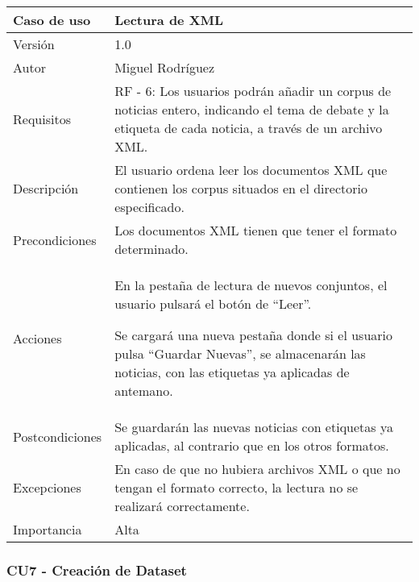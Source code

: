 \begin{center}
\begin{tabular}{ | m{3cm} | m{10cm}| } 
\hline
Caso de uso & Lectura de XML \\ 
\hline
Versión & 1.0 \\ 
\hline
Autor & Miguel Rodríguez \\ 
\hline
Requisitos & RF - 6: Los usuarios podrán añadir un corpus de noticias entero, indicando el tema de debate y la etiqueta de cada noticia, a través de un archivo XML. \\ 
\hline
Descripción & El usuario ordena leer los documentos XML que contienen los corpus situados en el directorio especificado.\\
\hline
Precondiciones & Los documentos XML tienen que tener el formato determinado. \\
\hline
Acciones & En la pestaña de lectura de nuevos conjuntos, el usuario pulsará el botón de ``Leer''. 

Se cargará una nueva pestaña donde si el usuario pulsa ``Guardar Nuevas'', se almacenarán las noticias, con las etiquetas ya aplicadas de antemano. \\
\hline
Postcondiciones & Se guardarán las nuevas noticias con etiquetas ya aplicadas, al contrario que en los otros formatos. \\
\hline
Excepciones & En caso de que no hubiera archivos XML o que no tengan el formato correcto, la lectura no se realizará correctamente. \\
\hline 
Importancia & Alta \\
\hline 
\end{tabular}
\end{center}

\clearpage
\subsubsection{CU7 - Creación de Dataset}


